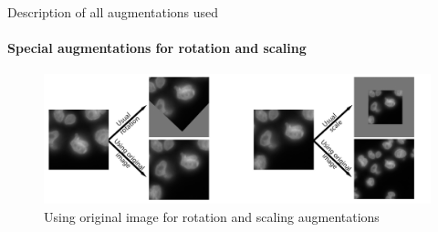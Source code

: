 Description of all augmentations used
\paragraph{Special augmentations for rotation and scaling}
\begin{figure}[H]
	\begin{center}
		\includegraphics[width=0.7\linewidth]{bilder/model training/smart augmentations.png}
		\caption{Using original image for rotation and scaling augmentations}\label{fig:smart-augments}
	\end{center}
\end{figure}